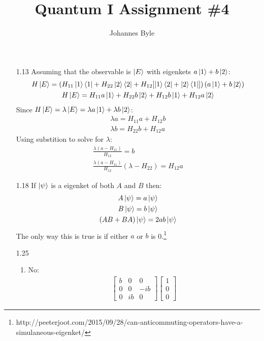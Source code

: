 \documentclass[12pt]{article}
\title{Quantum I Assignment \#4}
\author{Johannes Byle}
\begin{document}
  \maketitle
  \begin{enumerate}
    \item[1.13]
    Assuming that the observable is $\ket{E}$ with eigenkets $a\ket{1}+b\ket{2}$:
    \begin{gather}
      H\ket{E}=\left(H_{11}\ket{1}\bra{1}+H_{22}\ket{2}\bra{2}+H_{12}[\ket{1}\bra{2}+\ket{2}\bra{1}]\right)(a\ket{1}+b\ket{2})\\
      H\ket{E}=H_{11}a\ket{1}+H_{22}b\ket{2}+H_{12}b\ket{1}+H_{12}a\ket{2}
    \end{gather}
    Since $H\ket{E}=\lambda\ket{E}=\lambda a\ket{1}+\lambda b\ket{2}$:
    \begin{gather}
      \lambda a=H_{11}a+H_{12}b\\
      \lambda b=H_{22}b+H_{12}a
    \end{gather}
    Using substition to solve for $\lambda$:
    \begin{gather}
      \frac{\lambda(a-H_{11})}{H_{12}}=b\\
      \frac{\lambda(a-H_{11})}{H_{12}}(\lambda-H_{22})=H_{12}a
    \end{gather}
    \item[1.18]
    If $\ket{\psi}$ is a eigenket of both $A$ and $B$ then:
    \begin{gather*}
      A\ket{\psi}=a\ket{\psi}\\
      B\ket{\psi}=b\ket{\psi}\\
      (AB+BA)\ket{\psi}=2ab\ket{\psi}
    \end{gather*}
    The only way this is true is if either $a$ or $b$ is 0.\footnote{http://peeterjoot.com/2015/09/28/can-anticommuting-operators-have-a-simulaneous-eigenket/}
    \item[1.25]
    \begin{enumerate}
      \item No:
      \begin{gather}
        \begin{bmatrix}
          b & 0  & 0   \\
          0 & 0  & -ib \\
          0 & ib & 0
        \end{bmatrix}
        \begin{bmatrix}
          1 \\
          0 \\
          0

\end{bmatrix}
\end{gather}
\end{enumerate}
\end{enumerate}
\end{document}
